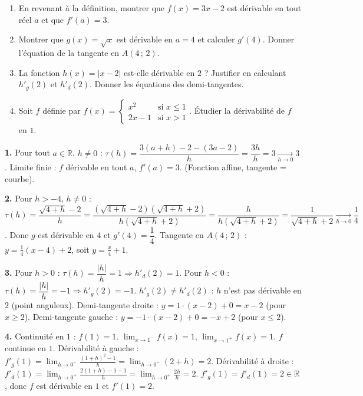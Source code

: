 \documentclass[11pt]{article}
\begin{document}
\begin{exercice}
\begin{enumerate}
\item En revenant à la définition, montrer que $f(x)=3x-2$ est dérivable en tout réel $a$ et que $f'(a)=3$.
\item Montrer que $g(x)=\sqrt{x}$ est dérivable en $a=4$ et calculer $g'(4)$. Donner l'équation de la tangente en $A(4\,;\,2)$.
\item La fonction $h(x)=|x-2|$ est-elle dérivable en $2$ ? Justifier en calculant $h'_g(2)$ et $h'_d(2)$. Donner les équations des demi-tangentes.
\item Soit $f$ définie par $f(x)= \begin{cases} x^2 & \text{si } x \le 1 \\ 2x-1 & \text{si } x > 1 \end{cases}$. Étudier la dérivabilité de $f$ en $1$.
\end{enumerate}
\end{exercice}

\begin{corrige}[Exercices]
\textbf{1.} Pour tout $a \in \mathbb{R}$, $h \neq 0$ :
$\tau(h)=\dfrac{3(a+h)-2-(3a-2)}{h}=\dfrac{3h}{h}=3 \xrightarrow[h\to 0]{} 3$.
Limite finie : $f$ dérivable en tout $a$, $f'(a)=3$. (Fonction affine, tangente = courbe).

\textbf{2.} Pour $h > -4$, $h \neq 0$ :
$\tau(h)=\dfrac{\sqrt{4+h}-2}{h}=\dfrac{(\sqrt{4+h}-2)(\sqrt{4+h}+2)}{h(\sqrt{4+h}+2)}=\dfrac{h}{h(\sqrt{4+h}+2)}=\dfrac{1}{\sqrt{4+h}+2} \xrightarrow[h\to 0]{} \dfrac{1}{4}$.
Donc $g$ est dérivable en $4$ et $g'(4)=\dfrac{1}{4}$.
Tangente en $A(4\,;\,2)$ : $y = \frac{1}{4}(x-4) + 2$, soit $y = \frac{x}{4} + 1$.

\textbf{3.} Pour $h>0$ : $\tau(h)=\dfrac{|h|}{h}=1 \Rightarrow h'_d(2)=1$.
Pour $h<0$ : $\tau(h)=\dfrac{|h|}{h}=-1 \Rightarrow h'_g(2)=-1$.
$h'_g(2) \neq h'_d(2)$ : $h$ n'est pas dérivable en $2$ (point anguleux).
Demi-tangente droite : $y = 1\cdot(x-2) + 0 = x-2$ (pour $x \ge 2$).
Demi-tangente gauche : $y = -1\cdot(x-2) + 0 = -x+2$ (pour $x \le 2$).

\textbf{4.} Continuité en $1$ : $f(1)=1$. $\lim_{x\to 1^-}f(x)=1$, $\lim_{x\to 1^+}f(x)=1$. $f$ continue en $1$.
Dérivabilité à gauche : $f'_g(1) = \lim_{h\to 0^-}\frac{(1+h)^2-1}{h} = \lim_{h\to 0^-}(2+h)=2$.
Dérivabilité à droite : $f'_d(1) = \lim_{h\to 0^+}\frac{2(1+h)-1-1}{h} = \lim_{h\to 0^+}\frac{2h}{h}=2$.
$f'_g(1)=f'_d(1)=2 \in \mathbb{R}$, donc $f$ est dérivable en $1$ et $f'(1)=2$.
\end{corrige}
\end{document}
